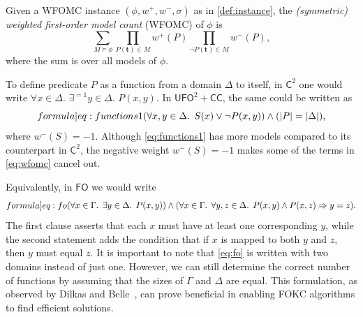 \documentclass[a4paper,UKenglish,cleveref, autoref, thm-restate]{lipics-v2021}
\newcommand{\Ctwo}{$\mathsf{C}^{2}$}
\newcommand{\FO}{$\mathsf{FO}$}
\newcommand{\UFO}{$\mathsf{UFO}^{2} + \mathsf{CC}$}
\begin{document}
\begin{definition}
  Given a WFOMC instance $(\phi, w^{+}, w^{-}, \sigma)$ as in
  \cref{def:instance}, the \emph{(symmetric) weighted first-order model count}
  (WFOMC) of $\phi$ is
  \begin{equation}\label{eq:wfomc}
    \sum_{M \models \phi} \prod_{P(\mathbf{t}) \in M} w^{+}(P) \prod_{\neg P(\mathbf{t}) \in M} w^{-}(P),
  \end{equation}
  where the sum is over all models of $\phi$.
\end{definition}

\begin{example}\label{example:functions}
  To define predicate $P$ as a function from a domain $\Delta$ to itself, in
  \Ctwo{} one would write $\forall x \in \Delta\text{.
  }\exists^{=1} y \in \Delta\text{. }P(x, y)$. In \UFO{}, the same could be
  written as
  \begin{equation}\label[formula]{eq:functions1}
    (\forall x, y \in \Delta\text{. }S(x) \lor \neg P(x, y)) \land (|P| = |\Delta|),
  \end{equation}
  where $w^{-}(S) = -1$. Although \cref{eq:functions1} has more models compared
  to its counterpart in \Ctwo{}, the negative weight $w^{-}(S) = -1$ makes some
  of the terms in \cref{eq:wfomc} cancel out.

  Equivalently, in \FO{} we would write
  \begin{equation}\label[formula]{eq:fo}
    \begin{gathered}
      (\forall x \in \Gamma\text{. }\exists y \in \Delta\text{. }P(x, y)) \land (\forall x \in \Gamma\text{. }\forall y, z \in \Delta\text{. }P(x, y) \land P(x, z) \Rightarrow y = z).
    \end{gathered}
  \end{equation}
  The first clause asserts that each $x$ must have at least one corresponding
  $y$, while the second statement adds the condition that if $x$ is mapped to
  both $y$ and $z$, then $y$ must equal $z$. It is important to note that
  \cref{eq:fo} is written with two domains instead of just one. However, we can
  still determine the correct number of functions by assuming that the sizes of
  $\Gamma$ and $\Delta$ are equal. This formulation, as observed by Dilkas and
  Belle~\cite{DBLP:conf/kr/DilkasB23}, can prove beneficial in enabling FOKC
  algorithms to find efficient solutions.
\end{example}
\end{document}
